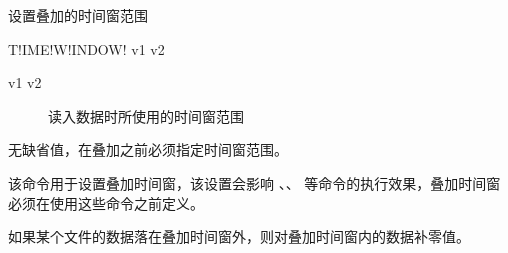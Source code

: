 \label{sss:timewindow}

设置叠加的时间窗范围

\begin{SACSTX}
T!IME!W!INDOW! v1 v2
\end{SACSTX}

\begin{description}
\item [v1 v2] 读入数据时所使用的时间窗范围
\end{description}

无缺省值，在叠加之前必须指定时间窗范围。

该命令用于设置叠加时间窗，该设置会影响 、、 等命令的执行效果，叠加时间窗必须在使用这些命令之前定义。

如果某个文件的数据落在叠加时间窗外，则对叠加时间窗内的数据补零值。
